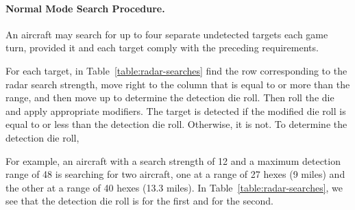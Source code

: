 {\begin{itemize}
\end{itemize}

\paragraph{Normal Mode Search Procedure.}
An aircraft may search for up to four separate undetected targets each game turn, provided it and each target comply with the preceding requirements. 

For each target, in Table~\ref{table:radar-searches} find the row corresponding to the radar search strength, move right to the column that is equal to or more than the range, and then move up to determine the detection die roll. Then roll the die and apply appropriate modifiers. The target is detected if the modified die roll is equal to or less than the detection die roll. Otherwise, it is not. To determine the detection die roll, 

For example, an aircraft with a search strength of 12 and a maximum detection range of 48 is searching for two aircraft, one at a range of 27 hexes (9 miles) and the other at a range of 40 hexes (13.3 miles). In Table~\ref{table:radar-searches}, we see that the detection die roll is  for the first and  for the second.


}
